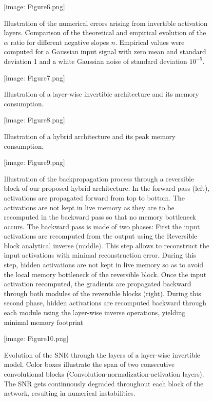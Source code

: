 \documentclass[twocolumn]{bmcart}
\def\texttt{[image: ]}
\begin{document}
\begin{backmatter}
\begin{figure}[t]
\texttt{[image: Figure6.png]}
\caption{
Illustration of the numerical errors arising from invertible activation layers.
Comparison of the theoretical and empirical evolution of the $\alpha$ ratio for different negative slopes $n$.
Empirical values were computed for a Gaussian input signal with zero mean and standard deviation 1 and a white Gaussian noise of standard deviation $10^{-5}$.
}
\end{figure}
\begin{figure}[t]
\texttt{[image: Figure7.png]}
\caption{
Illustration of a layer-wise invertible architecture and its memory consumption.
}
\end{figure}

\begin{figure}[t]
\texttt{[image: Figure8.png]}
\caption{
Illustration of a hybrid architecture and its peak memory consumption.
}
\end{figure}

\begin{figure}[t]
\texttt{[image: Figure9.png]}
\caption{
Illustration of the backpropagation process through a reversible block of our proposed hybrid architecture.
In the forward pass (left), activations are propagated forward from top to bottom.
The activations are not kept in live memory as they are to be recomputed in the backward pass so that no memory bottleneck occurs.
The backward pass is made of two phases:
First the input activations are recomputed from the output using the Reversible block analytical inverse (middle).
This step allows to reconstruct the input activations with minimal reconstruction error.
During this step, hidden activations are not kept in live memory so as to avoid the local memory bottleneck of the reversible block.
Once the input activation recomputed, the gradients are propagated backward through both modules of the reversible blocks (right).
During this second phase, hidden activations are recomputed backward through each module using the layer-wise inverse operations, yielding minimal memory footprint
}
\end{figure}


\begin{figure}[t]
\texttt{[image: Figure10.png]}
\caption{
Evolution of the SNR through the layers of a layer-wise invertible model.
Color boxes illustrate the span of two consecutive convolutional blocks (Convolution-normalization-activation layers).
The SNR gets continuously degraded throughout each block of the network, resulting in numerical instabilities.
}
\end{figure}


\end{backmatter}
\end{document}
